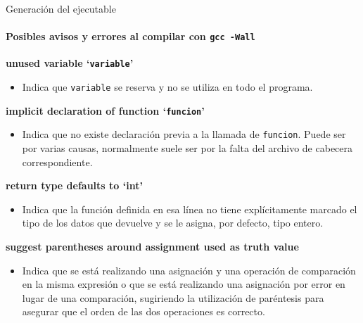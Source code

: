 \documentclass{beamer}
\begin{document}
	\begin{frame}{Generación del ejecutable}	
       \framesubtitle{Posibles avisos y errores al compilar con \texttt{gcc -Wall}}

\begin{footnotesize}
	\textbf{unused variable `\texttt{variable}'} \\
\begin{itemize}
\vspace{-0.2cm}
\justifying\item[]  Indica que \texttt{variable} se reserva y no se utiliza en todo el programa.
\end{itemize}

	\textbf{implicit declaration of function `\texttt{funcion}'} \\
\begin{itemize}
\vspace{-0.2cm}
\justifying\item[] Indica que no existe declaración previa a la llamada de \texttt{funcion}. Puede ser por varias causas, normalmente suele ser por la falta del archivo de cabecera correspondiente.
\end{itemize}


	\textbf{return type defaults to `int'} \\
\begin{itemize}
\vspace{-0.2cm}
\justifying\item[]  Indica que la función definida en esa línea no tiene explícitamente marcado el tipo de los datos que devuelve y se le asigna, por defecto, tipo entero.
\end{itemize}

	\textbf{suggest parentheses around assignment used as truth value} \\
\begin{itemize}
\vspace{-0.2cm}
\justifying\item[] Indica que se está realizando una asignación y una operación de comparación en la misma expresión o que se está realizando una asignación por error en lugar de una comparación, sugiriendo la utilización de paréntesis para asegurar que el orden de las dos operaciones es correcto.
\end{itemize}

	\end{footnotesize}	
	
\end{frame}
\end{document}
